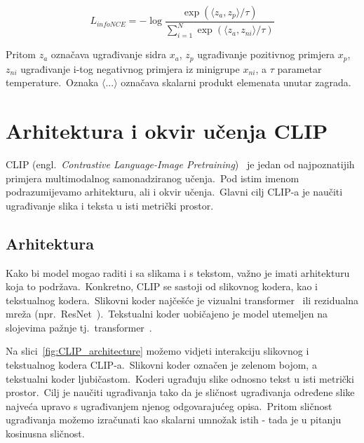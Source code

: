 \documentclass[times, utf8, seminar, numeric]{fer}
\begin{document}
\begin{equation}
    L_{infoNCE} = - \log{\frac{\exp(\langle z_{a}, z_{p} \rangle / \tau)}{\sum_{i=1}^{N}{\exp(\langle z_{a}, z_{ni} \rangle / \tau)}}}
    \label{eq:infoNCE}
\end{equation}

Pritom $z_{a}$ označava ugrađivanje sidra $x_{a}$, $z_{p}$ ugrađivanje pozitivnog primjera $x_{p}$, $z_{ni}$ ugrađivanje i-tog negativnog primjera iz minigrupe $x_{ni}$, a $\tau$ parametar temperature.\ 
Oznaka $\langle ... \rangle$ označava skalarni produkt elemenata unutar zagrada.\

\section{Arhitektura i okvir učenja CLIP}

CLIP (engl.\ \textit{Contrastive Language-Image Pretraining})~\cite{radford2021learning} je jedan od najpoznatijih primjera multimodalnog samonadziranog učenja.\ 
Pod istim imenom podrazumijevamo arhitekturu, ali i okvir učenja.\ Glavni cilj CLIP-a je naučiti ugrađivanje slika i teksta u isti metrički prostor.\ 

\subsection{Arhitektura}

Kako bi model mogao raditi i sa slikama i s tekstom, važno je imati arhitekturu koja to podržava.\ Konkretno, CLIP se sastoji od slikovnog kodera, kao i tekstualnog kodera.\ 
Slikovni koder najčešće je vizualni transformer~\cite{han2021transformer} ili rezidualna mreža (npr.\ ResNet~\cite{he2016identity}).\ 
Tekstualni koder uobičajeno je model utemeljen na slojevima pažnje tj.\ transformer~\cite{vaswani2017attention}.\ 

Na slici~\ref{fig:CLIP_architecture} možemo vidjeti interakciju slikovnog i tekstualnog kodera CLIP-a.\ Slikovni koder označen je zelenom bojom, a tekstualni koder ljubičastom.\ 
Koderi ugrađuju slike odnosno tekst u isti metrički prostor.\ Cilj je naučiti ugrađivanja tako da je sličnost ugrađivanja određene slike najveća upravo s ugrađivanjem njenog odgovarajućeg opisa.\ 
Pritom sličnost ugrađivanja možemo izračunati kao skalarni umnožak istih - tada je u pitanju kosinusna sličnost.\

\pagebreak
\end{document}
